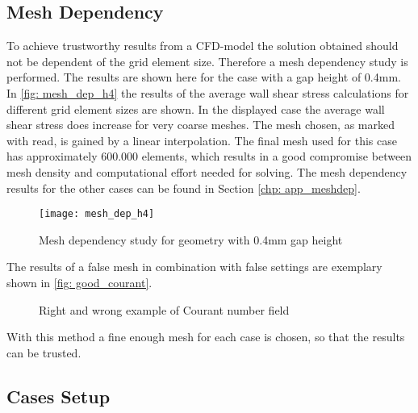 \documentclass[../thesis.tex]{subfiles}
\begin{document}
\subsection{Mesh Dependency}
\label{sec: mesh_dep}

To achieve trustworthy results from a CFD-model the solution obtained should not be dependent of the grid element size. Therefore a mesh dependency study is performed. The results are shown here for the case with a gap height of 0.4mm. In \autoref{fig: mesh_dep_h4} the results of the average wall shear stress calculations for different grid element sizes are shown. In the displayed case the average wall shear stress does increase for very coarse meshes. The mesh chosen, as marked with read, is gained by a linear interpolation. The final mesh used for this case has approximately 600.000 elements, which results in a good compromise between mesh density and computational effort needed for solving. The mesh dependency results for the other cases can be found in Section \ref{chp: app_meshdep}.
\begin{figure}[htb]
	\centering
	\texttt{[image: mesh\_dep\_h4]}
	\caption{Mesh dependency study for geometry with 0.4mm gap height}
	\label{fig: mesh_dep_h4}
\end{figure}

The results of a false mesh in combination with false settings are exemplary shown in \autoref{fig: good_courant}.
\begin{figure}[htbp]
	\centering
	\qquad
	\caption{Right and wrong example of Courant number field}
	\label{fig: good_courant}
\end{figure}
With this method a fine enough mesh for each case is chosen, so that the results can be trusted.

\subsection{Cases Setup}
\end{document}
